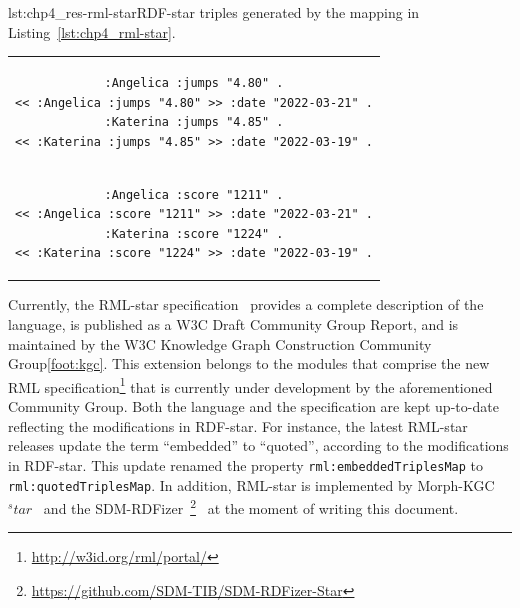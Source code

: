 \noindent\hspace{0.1\linewidth}\begin{minipage}{\linewidth}
\begin{captionedlisting}{lst:chp4_res-rml-star}{RDF-star triples generated by the mapping in Listing~\ref{lst:chp4_rml-star}.}
\centering
\begin{tabular}{c}
\hspace{2em}
{\begin{lstlisting}[basicstyle=\ttfamily\small,label={list:example1},columns=flexible]
:Angelica :jumps "4.80" .
<< :Angelica :jumps "4.80" >> :date "2022-03-21" .
:Katerina :jumps "4.85" .
<< :Katerina :jumps "4.85" >> :date "2022-03-19" .
\end{lstlisting}}\\
\hspace{2em}
{\begin{lstlisting}[basicstyle=\ttfamily\small,label={list:example1},columns=flexible,frame=l,rulecolor=\color{red},framerule=0.75pt,firstnumber=5]
:Angelica :score "1211" .
<< :Angelica :score "1211" >> :date "2022-03-21" .
:Katerina :score "1224" .
<< :Katerina :score "1224" >> :date "2022-03-19" .
\end{lstlisting}}

\end{tabular}
\end{captionedlisting}
\end{minipage}


Currently, the \mbox{RML-star} specification~\parencite{iglesias2022rmlstar} provides a complete description of the language, is published as a W3C Draft Community Group Report, and is maintained by the W3C Knowledge Graph Construction Community Group\cref{foot:kgc}. 
This extension belongs to the modules that comprise the new RML specification\footnote{\label{foot:rml-portal}\url{http://w3id.org/rml/portal/}} that is currently under development by the aforementioned Community Group. 
Both the language and the specification are kept up-to-date reflecting the modifications in \mbox{RDF-star}.
For instance, the latest \mbox{RML-star} releases update the term ``embedded'' to ``quoted'',
according to the modifications in \mbox{RDF-star}.
This update renamed the property \texttt{rml:embeddedTriplesMap} to \texttt{rml:quotedTriplesMap}.
In addition, RML-star is implemented by Morph-KGC$^star$~\parencite{arenas2023morphstar} and the SDM-RDFizer~\footnote{\url{https://github.com/SDM-TIB/SDM-RDFizer-Star}}~\parencite{iglesias2020rdfizer} at the moment of writing this document.




